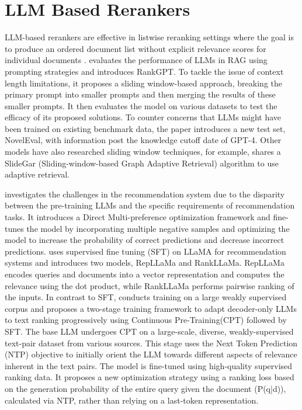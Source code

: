 \documentclass[runningheads]{llncs}
\begin{document}
\section{LLM Based Rerankers} \label{llm-rerankers}

LLM-based rerankers are effective in listwise reranking settings where the goal is to produce an ordered document list without explicit relevance scores for individual documents \cite{sun2024chatgptgoodsearchinvestigating, pradeep2023rankvicunazeroshotlistwisedocument, pradeep2023rankzephyreffectiverobustzeroshot, ma2023zeroshotlistwisedocumentreranking, sun2025investigationpromptvariationszeroshot}. \cite{sun2024chatgptgoodsearchinvestigating} evaluates the performance of LLMs in RAG using prompting strategies and introduces RankGPT. To tackle the issue of context length limitations, it proposes a sliding window-based approach, breaking the primary prompt into smaller prompts and then merging the results of these smaller prompts. It then evaluates the model on various datasets to test the efficacy of its proposed solutions. To counter concerns that LLMs might have been trained on existing benchmark data, the paper introduces a new test set, NovelEval, with information post the knowledge cutoff date of GPT-4\cite{openai2024gpt4technicalreport}. Other models have also researched sliding window techniques, for example, \cite{rathee2025guidingretrievalusingllmbased} shares a SlideGar (Sliding-window-based Graph Adaptive Retrieval) algorithm to use adaptive retrieval.

\cite{bai2024finetuninglargelanguagemodel} investigates the challenges in the recommendation system due to the disparity between the pre-training LLMs and the specific requirements of recommendation tasks. It introduces a Direct Multi-preference optimization framework and fine-tunes the model by incorporating multiple negative samples and optimizing the model to increase the probability of correct predictions and decrease incorrect predictions. \cite{ma2023finetuningllamamultistagetext} uses supervised fine tuning  (SFT) on LLaMA\cite{touvron2023llamaopenefficientfoundation} for recommendation systems and introduces two models, RepLLaMa and RankLLaMa. RepLLaMa encodes queries and documents into a vector representation and computes the relevance using the dot product, while RankLLaMa performs pairwise ranking of the inputs. In contrast to SFT, \cite{zhang2024twostageadaptationlargelanguage} conducts training on a large weakly supervised corpus and proposes a two-stage training framework to adapt decoder-only LLMs to text ranking progressively using  Continuous Pre-Training(CPT)  followed by SFT. The base LLM undergoes CPT on a large-scale, diverse, weakly-supervised text-pair dataset from various sources. This stage uses the Next Token Prediction (NTP) objective to initially orient the LLM towards different aspects of relevance inherent in the text pairs. The model is fine-tuned using high-quality supervised ranking data. It proposes a new optimization strategy using a ranking loss based on the generation probability of the entire query given the document (P(q|d)), calculated via NTP, rather than relying on a last-token representation.
\end{document}
